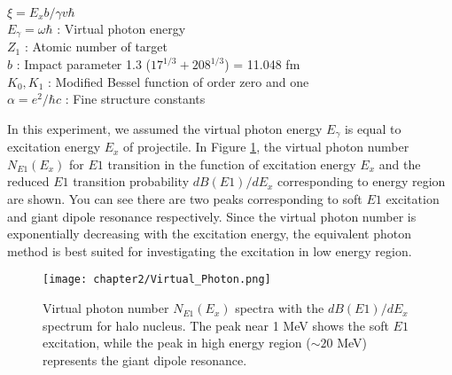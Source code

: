 \begin{adjustwidth}{1cm}{1cm}
    $\xi = E_x b / \gamma v \hbar$ \\
    $E_{\gamma} = \omega \hbar$ : Virtual photon energy\\ 
    $Z_{1}$ : Atomic number of target\\
    $b$ : Impact parameter 1.3 ($17^{1/3} + 208^{1/3}$) = 11.048 fm\\
    $K_0, K_1$ : Modified Bessel function of order zero and one \\
    $\alpha = e^2 / \hbar c$ : Fine structure constants\\
\end{adjustwidth}
In this experiment, we assumed the virtual photon energy $E_{\gamma}$ is equal to excitation energy $E_x$ of projectile. In Figure \ref{fig:Virtual_Photon}, the virtual photon number $N_{E1}(E_x)$ for $E1$ transition in the function of excitation energy $E_x$ and the reduced $E1$ transition probability $dB(E1)/dE_x$ corresponding to energy region are shown. You can see there are two peaks corresponding to soft $E1$ excitation and giant dipole resonance respectively. Since the virtual photon number is exponentially decreasing with the excitation energy, the equivalent photon method is best suited for investigating the excitation in low energy region. 

\begin{figure}[t]
    \centering
    \texttt{[image: chapter2/Virtual\_Photon.png]}
    \caption[Virtual photon number $N_{E1}(E_x)$ spectra and $dB(E1)/dE_x$ spectrum for halo nucleus]{Virtual photon number $N_{E1}(E_x)$ spectra with the $dB(E1)/dE_x$ spectrum for halo nucleus\cite{Nakamura23}. The peak near 1 MeV shows the soft $E1$ excitation, while the peak in high energy region ($\sim 20$ MeV) represents the giant dipole resonance.}
    \label{fig:Virtual_Photon}
\end{figure}

